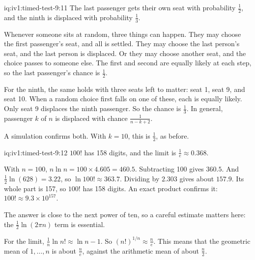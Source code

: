 \begin{solution}{iq:iv1:timed-test-9:11}
The last passenger gets their own seat with probability $\frac12$, and the ninth is displaced with probability $\frac13$.

Whenever someone sits at random, three things can happen. They may choose the first passenger's seat, and all is settled. They may choose the last person's seat, and the last person is displaced. Or they may choose another seat, and the choice passes to someone else. The first and second are equally likely at each step, so the last passenger's chance is $\frac12$.

For the ninth, the same holds with three seats left to matter: seat 1, seat 9, and seat 10. When a random choice first falls on one of these, each is equally likely. Only seat 9 displaces the ninth passenger. So the chance is $\frac13$. In general, passenger $k$ of $n$ is displaced with chance $\frac{1}{n - k + 2}$.

A simulation confirms both. With $k = 10$, this is $\frac12$, as before.

\end{solution}

\begin{solution}{iq:iv1:timed-test-9:12}
$100!$ has 158 digits, and the limit is $\frac1e \approx 0.368$.

With $n = 100$, $n\ln n = 100 \times 4.605 = 460.5$. Subtracting 100 gives $360.5$. And $\frac12\ln(628) = 3.22$, so $\ln 100! \approx 363.7$. Dividing by $2.303$ gives about $157.9$. Its whole part is 157, so $100!$ has 158 digits. An exact product confirms it: $100! \approx 9.3 \times 10^{157}$.

The answer is close to the next power of ten, so a careful estimate matters here: the $\frac12\ln(2\pi n)$ term is essential.

For the limit, $\frac1n\ln n! \approx \ln n - 1$. So $(n!)^{1/n} \approx \frac{n}{e}$. This means that the geometric mean of $1, \dots, n$ is about $\frac{n}{e}$, against the arithmetic mean of about $\frac{n}{2}$.

\end{solution}
